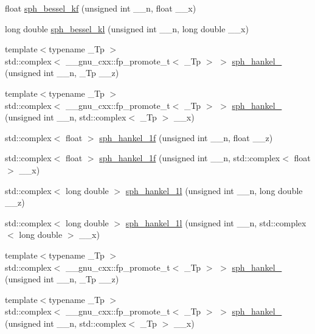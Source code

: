 \begin{DoxyCompactItemize}
\item 
float \hyperlink{group__mathsf__gnu_gaf886e8f8dfd2af0c4a9c5929d193d12f}{sph\+\_\+bessel\+\_\+kf} (unsigned int \+\_\+\+\_\+n, float \+\_\+\+\_\+x)
\item 
long double \hyperlink{group__mathsf__gnu_ga22f6a73e50e7020a7c2fa64ce1b9be41}{sph\+\_\+bessel\+\_\+kl} (unsigned int \+\_\+\+\_\+n, long double \+\_\+\+\_\+x)
\item 
{\footnotesize template$<$typename \+\_\+\+Tp $>$ }\\std\+::complex$<$ \+\_\+\+\_\+gnu\+\_\+cxx\+::fp\+\_\+promote\+\_\+t$<$ \+\_\+\+Tp $>$ $>$ \hyperlink{group__mathsf__gnu_ga4424f565fb224ab88b177beb65d08305}{sph\+\_\+hankel\+\_} (unsigned int \+\_\+\+\_\+n, \+\_\+\+Tp \+\_\+\+\_\+z)
\item 
{\footnotesize template$<$typename \+\_\+\+Tp $>$ }\\std\+::complex$<$ \+\_\+\+\_\+gnu\+\_\+cxx\+::fp\+\_\+promote\+\_\+t$<$ \+\_\+\+Tp $>$ $>$ \hyperlink{group__mathsf__gnu_ga3d256857c000a966e89526cb99253aca}{sph\+\_\+hankel\+\_} (unsigned int \+\_\+\+\_\+n, std\+::complex$<$ \+\_\+\+Tp $>$ \+\_\+\+\_\+x)
\item 
std\+::complex$<$ float $>$ \hyperlink{group__mathsf__gnu_ga70d4fc01069f3f0ac0e3b52fe1dffea4}{sph\+\_\+hankel\+\_\+1f} (unsigned int \+\_\+\+\_\+n, float \+\_\+\+\_\+z)
\item 
std\+::complex$<$ float $>$ \hyperlink{group__mathsf__gnu_gadbb875cd50abb62ac75386143486bb2c}{sph\+\_\+hankel\+\_\+1f} (unsigned int \+\_\+\+\_\+n, std\+::complex$<$ float $>$ \+\_\+\+\_\+x)
\item 
std\+::complex$<$ long double $>$ \hyperlink{group__mathsf__gnu_ga6e77fd5cddfbd57d9120b20fc6c30e6f}{sph\+\_\+hankel\+\_\+1l} (unsigned int \+\_\+\+\_\+n, long double \+\_\+\+\_\+z)
\item 
std\+::complex$<$ long double $>$ \hyperlink{group__mathsf__gnu_ga3e9d889d8f2e4792e892b12b1f5948b9}{sph\+\_\+hankel\+\_\+1l} (unsigned int \+\_\+\+\_\+n, std\+::complex$<$ long double $>$ \+\_\+\+\_\+x)
\item 
{\footnotesize template$<$typename \+\_\+\+Tp $>$ }\\std\+::complex$<$ \+\_\+\+\_\+gnu\+\_\+cxx\+::fp\+\_\+promote\+\_\+t$<$ \+\_\+\+Tp $>$ $>$ \hyperlink{group__mathsf__gnu_ga1ca08866a25e3637b04c57ff5a0c36a5}{sph\+\_\+hankel\+\_} (unsigned int \+\_\+\+\_\+n, \+\_\+\+Tp \+\_\+\+\_\+z)
\item 
{\footnotesize template$<$typename \+\_\+\+Tp $>$ }\\std\+::complex$<$ \+\_\+\+\_\+gnu\+\_\+cxx\+::fp\+\_\+promote\+\_\+t$<$ \+\_\+\+Tp $>$ $>$ \hyperlink{group__mathsf__gnu_ga0e7d9b5a93ab1d1040040f0ef44590de}{sph\+\_\+hankel\+\_} (unsigned int \+\_\+\+\_\+n, std\+::complex$<$ \+\_\+\+Tp $>$ \+\_\+\+\_\+x)

\end{DoxyCompactItemize}
